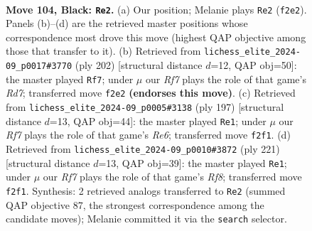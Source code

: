 \documentclass[11pt]{article}
\begin{document}
\clearpage

\begin{figure}[p]\centering
\begin{subfigure}{0.46\textwidth}\centering
\resizebox{\linewidth}{!}{%
\newchessgame
\chessboard[
  setfen={8/2R3pk/1N3p2/7p/7P/6PK/5r2/8 b - - 33 104},
  showmover=false,
  pgfstyle=straightmove, color=movearrow, markmove={f2-e2}
]}
\caption{}
\end{subfigure}\hfill
\begin{subfigure}{0.46\textwidth}\centering
\resizebox{\linewidth}{!}{%
\newchessgame
\chessboard[
  setfen={8/3R4/6pk/7p/7P/2r3PK/8/8 w - - 40 102},
  showmover=false,
  pgfstyle=straightmove, color=movearrow, markmove={d7-f7}
]}
\caption{}
\end{subfigure}
\\[4pt]
\begin{subfigure}{0.46\textwidth}\centering
\resizebox{\linewidth}{!}{%
\newchessgame
\chessboard[
  setfen={8/4R2p/6pP/3k2P1/4p1K1/4r3/8/8 b - - 3 99},
  showmover=false,
  pgfstyle=straightmove, color=movearrow, markmove={e3-e1}
]}
\caption{}
\end{subfigure}\hfill
\begin{subfigure}{0.46\textwidth}\centering
\resizebox{\linewidth}{!}{%
\newchessgame
\chessboard[
  setfen={8/2R2pk1/6p1/4P3/6PP/6K1/8/5r2 b - - 4 111},
  showmover=false,
  pgfstyle=straightmove, color=movearrow, markmove={f1-e1}
]}
\caption{}
\end{subfigure}
\caption{\textbf{Move 104, Black: \texttt{Re2}.} (a) Our position; Melanie plays \texttt{Re2} (\texttt{f2e2}). Panels (b)--(d) are the retrieved master positions whose correspondence most drove this move (highest QAP objective among those that transfer to it). (b) Retrieved from \texttt{lichess\_elite\_2024-09\_p0017\#3770} (ply 202) [structural distance $d$=12, QAP obj=50]: the master played \texttt{Rf7}; under $\mu$ our \emph{Rf7} plays the role of that game's \emph{Rd7}; transferred move \texttt{f2e2} \textbf{(endorses this move)}. (c) Retrieved from \texttt{lichess\_elite\_2024-09\_p0005\#3138} (ply 197) [structural distance $d$=13, QAP obj=44]: the master played \texttt{Re1}; under $\mu$ our \emph{Rf7} plays the role of that game's \emph{Re6}; transferred move \texttt{f2f1}. (d) Retrieved from \texttt{lichess\_elite\_2024-09\_p0010\#3872} (ply 221) [structural distance $d$=13, QAP obj=39]: the master played \texttt{Re1}; under $\mu$ our \emph{Rf7} plays the role of that game's \emph{Rf8}; transferred move \texttt{f2f1}. Synthesis: 2 retrieved analogs transferred to \texttt{Re2} (summed QAP objective 87, the strongest correspondence among the candidate moves); Melanie committed it via the \texttt{search} selector.}
\label{fig:thought-m207}
\end{figure}
\end{document}
